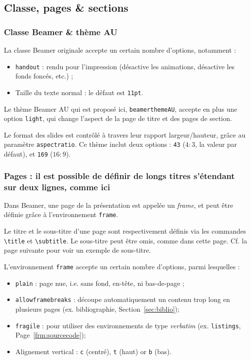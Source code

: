 \documentclass[10pt,    %
    french,             %
    xcolor=table,       %
    envcountsect,       %
    aspectratio=43      %
]{beamer}
\begin{document}
\subsection{Classe, pages \& sections}

\begin{frame}
    \frametitle{Classe Beamer \& thème AU}
    
    La classe Beamer originale accepte un certain nombre d'options, notamment :
    \begin{itemize}
        \item \texttt{handout} : rendu pour l'impression (désactive les animations, désactive les fonds foncés, etc.) ;
        \item Taille du texte normal : le défaut est \texttt{11pt}.
    \end{itemize}

    \medskip
    Le thème Beamer AU qui est proposé ici, \texttt{beamerthemeAU}, accepte en plus une option \texttt{light}, qui change l'aspect de la page de titre et des pages de section.
    
    \medskip
    Le format des slides est contrôlé à travers leur rapport largeur/hauteur, grâce au paramètre \texttt{aspectratio}. Ce thème inclut deux options : \texttt{43} ($4{:}3$, la valeur par défaut), et \texttt{169} ($16{:}9$).
\end{frame}

\begin{frame}
    \frametitle{Pages : il est possible de définir de longs titres s'étendant sur deux lignes, comme ici} 
    
    Dans Beamer, une page de la présentation est appelée un \textit{frame}, et peut être définie grâce à l'environnement \texttt{frame}.
    
    \medskip
    Le titre et le sous-titre d'une page sont respectivement définis via les commandes \texttt{\textbackslash{}title} et \texttt{\textbackslash{}subtitle}. Le sous-titre peut être omis, comme dans cette page. Cf. la page suivante pour voir un exemple de sous-titre.
    
    \medskip
    L'environnement \texttt{frame} accepte un certain nombre d'options, parmi lesquelles : 
    \begin{itemize}
        \item \texttt{plain} : page nue, i.e. sans fond, en-tête, ni bas-de-page ;
        \item \texttt{allowframebreaks} : découpe automatiquement un contenu trop long en plusieurs pages (ex. bibliographie, Section~\ref{sec:biblio});
        \item \texttt{fragile} : pour utiliser des environnements de type \textit{verbatim} (ex. \texttt{listings}, Page~\ref{frm:sourcecode});
        \item Alignement vertical : \texttt{c} (centré), \texttt{t} (haut) or \texttt{b} (bas).
    \end{itemize}
\end{frame}
\end{document}
